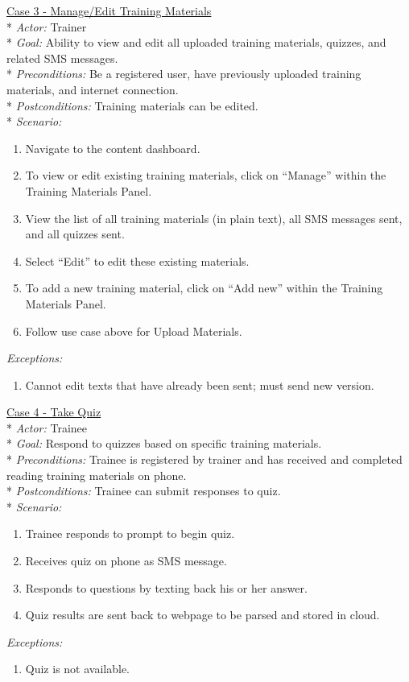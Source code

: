 \underline{Case 3 - Manage/Edit Training Materials}\\*
\textit{Actor:} Trainer\\*
\textit{Goal:} Ability to view and edit all uploaded training materials, quizzes, and related SMS messages.\\*
\textit{Preconditions:} Be a registered user, have previously uploaded training materials, and internet connection.\\*
\textit{Postconditions:} Training materials can be edited.\\*
\textit{Scenario:}
\begin{enumerate}
	\item{Navigate to the content dashboard.}
	\item{To view or edit existing training materials, click on “Manage” within the Training Materials Panel.}
	\item{View the list of all training materials (in plain text), all SMS messages sent, and all quizzes sent.}
	\item{Select “Edit” to edit these existing materials.}
	\item{To add a new training material, click on “Add new” within the Training Materials Panel.}
	\item{Follow use case above for Upload Materials.}
\end{enumerate}
\textit{Exceptions:}
\begin{enumerate}
	\item{Cannot edit texts that have already been sent; must send new version.}\\
\end{enumerate}

\underline{Case 4 - Take Quiz}\\*
\textit{Actor:} Trainee\\*
\textit{Goal:} Respond to quizzes based on specific training materials.\\*
\textit{Preconditions:} Trainee is registered by trainer and has received and completed reading training materials on phone.\\*
\textit{Postconditions:} Trainee can submit responses to quiz.\\*
\textit{Scenario:}
\begin{enumerate}
	\item{Trainee responds to prompt to begin quiz.}
	\item{Receives quiz on phone as SMS message.}
	\item{Responds to questions by texting back his or her answer.}
	\item{Quiz results are sent back to webpage to be parsed and stored in cloud.}
\end{enumerate}
\textit{Exceptions:}
\begin{enumerate}
	\item{Quiz is not available.}
\end{enumerate}